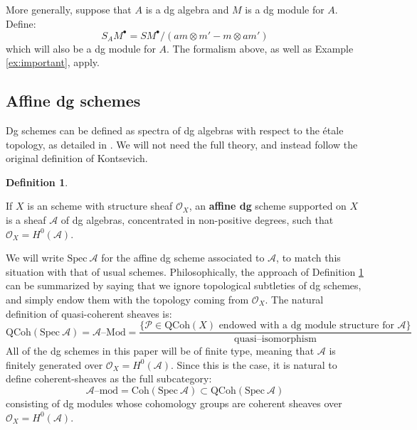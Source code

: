 \documentclass[12pt]{amsart}
\numberwithin{equation}{section}
\theoremstyle{definition}
\newtheorem{definition}[theorem]{Definition}
\theoremstyle{remark}
\newcommand{\CA}{\mathcal{A}}
\newcommand{\CO}{\mathcal{O}}
\newcommand{\CP}{\mathcal{P}}
\renewcommand{\1}{\mathbf{1}}
\newcommand{\coh}{\mathrm{Coh}}
\newcommand{\qcoh}{\mathrm{QCoh}}
\newcommand{\spec}{\mathrm{Spec}}
\begin{document}
More generally, suppose that $A$ is a dg algebra and $M$ is a dg module for $A$. Define:
$$
S_{A} M^\bullet = SM^\bullet \Big/ \left( am \otimes m' - m \otimes a m' \right)
$$
which will also be a dg module for $A$. The formalism above, as well as Example \ref{ex:important}, apply. 


\subsection{Affine dg schemes}
\label{sub:affine dg schemes}

Dg schemes can be defined as spectra of dg algebras with respect to the \'{e}tale topology, as detailed in \cite{B}. We will not need the full theory, and instead follow the original definition of Kontsevich. 

\begin{definition}
\label{def:dg scheme}

If $X$ is an scheme with structure sheaf $\CO_X$, an \textbf{affine dg} scheme supported on $X$ is a sheaf $\CA$ of dg algebras, concentrated in non-positive degrees, such that $\CO_X = H^0(\CA)$. 

\end{definition}

We will write $\spec \ \CA$ for the affine dg scheme associated to $\CA$, to match this situation with that of usual schemes. Philosophically, the approach of Definition \ref{def:dg scheme} can be summarized by saying that we ignore topological subtleties of dg schemes, and simply endow them with the topology coming from $\CO_X$. The natural definition of quasi-coherent sheaves is: 
$$
\qcoh(\spec \ \CA) = \CA\text{--Mod} = \frac {\Big\{ \CP \in \qcoh(X) \text{ endowed with a dg module structure for }\CA \Big\}}{\text{quasi--isomorphism}}
$$
All of the dg schemes in this paper will be of finite type, meaning that $\CA$ is finitely generated over $\CO_X = H^0(\CA)$. Since this is the case, it is natural to define coherent-sheaves as the full subcategory:
$$
\CA\text{--mod} = \coh(\spec \ \CA) \subset \qcoh(\spec \ \CA)
$$
consisting of dg modules whose cohomology groups are coherent sheaves over $\CO_X = H^0(\CA)$.
\end{document}
